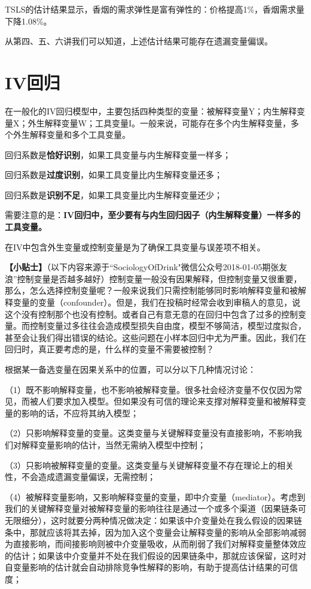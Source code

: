 \documentclass[cn,12pt,math=newtx,citestyle=gb7714-2015,bibstyle=gb7714-2015]{elegantbook}
\begin{document}
	TSLS的估计结果显示，香烟的需求弹性是富有弹性的：价格提高1\%，香烟需求量下降1.08\%。
	
	从第四、五、六讲我们可以知道，上述估计结果可能存在遗漏变量偏误。
	
	\section{IV回归}
	在一般化的IV回归模型中，主要包括四种类型的变量：被解释变量Y；内生解释变量X；外生解释变量W；工具变量I。一般来说，可能存在多个内生解释变量，多个外生解释变量和多个工具变量。
	
	回归系数是\textbf{恰好识别}，如果工具变量与内生解释变量一样多；
	
	回归系数是\textbf{过度识别}，如果工具变量比内生解释变量还多；
	
	回归系数是\textbf{识别不足}，如果工具变量比内生解释变量还少；
	
	需要注意的是：\textbf{IV回归中，至少要有与内生回归因子（内生解释变量）一样多的工具变量。}
	
	在IV中包含外生变量或控制变量是为了确保工具变量与误差项不相关。
	
	\textbf{【小贴士】}（以下内容来源于“SociologyOfDrink"微信公众号2018-01-05期张友浪”控制变量是否越多越好）控制变量一般没有因果解释，但控制变量又很重要，那么，怎么选择控制变量呢？一般来说我们只需控制能够同时影响解释变量和被解释变量的变量（confounder）。但是，我们在投稿时经常会收到审稿人的意见，说这个没有控制那个也没有控制。或者自己有意无意的在回归中包含了过多的控制变量。而控制变量过多往往会造成模型损失自由度，模型不够简洁，模型过度拟合，甚至会让我们得出错误的结论。这些问题在小样本回归中尤为严重。因此，我们在回归时，真正要考虑的是，什么样的变量不需要被控制？
	
	根据某一备选变量在因果关系中的位置，可以分以下几种情况讨论：
	
	（1）既不影响解释变量，也不影响被解释变量。很多社会经济变量不仅仅因为常见，而被人们要求加入模型。但如果没有可信的理论来支撑对解释变量和被解释变量的影响的话，不应将其纳入模型；
	
	（2）只影响解释变量的变量。这类变量与关键解释变量没有直接影响，不影响我们对解释变量影响的估计，当然无需纳入模型中控制；
	
	（3）只影响被解释变量的变量。这类变量与关键解释变量不存在理论上的相关性，不会造成遗漏变量偏误，无需控制；
	
	（4）被解释变量影响，又影响解释变量的变量，即中介变量（mediator）。考虑到我们的关键解释变量对被解释变量的影响往往是通过一个或多个渠道（因果链条可无限细分），这时就要分两种情况做决定：如果该中介变量处在我么假设的因果链条中，那就应该将其去掉，因为加入这个变量会让解释变量的影响从全部影响减弱为直接影响，而间接影响则被中介变量吸收，从而削弱了我们对解释变量整体效应的估计；如果该中介变量并不处在我们假设的因果链条中，那就应该保留，这时对自变量影响的估计就会自动排除竞争性解释的影响，有助于提高估计结果的可信度；
	
\end{document}
